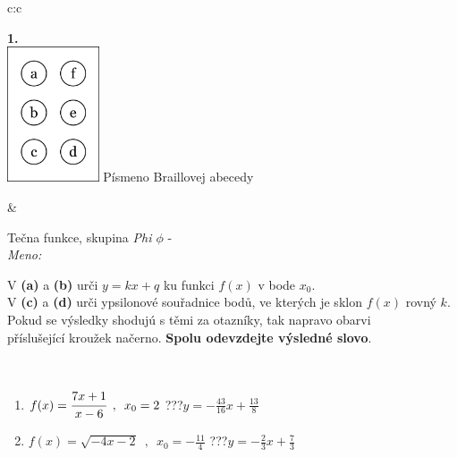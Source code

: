 \documentclass[10pt]{report}
\begin{document}
\begin{tabular}{c:c}
\begin{minipage}[c][104.5mm][t]{0.5\linewidth}
\begin{center}
\begin{minipage}{0.20\linewidth}
\begin{center}
{\Huge\bfseries 1.} \\[2mm]
\includegraphics[height=40mm]{../images/braille.png}
{\small Písmeno Braillovej abecedy}
\end{center}
\end{minipage}
\end{center}
\end{minipage}
&
\begin{minipage}[c][104.5mm][t]{0.5\linewidth}
\begin{center}
\vspace{7mm}
{\huge Tečna funkce, skupina \textit{Phi $\phi$} -}\\[5mm]
\textit{Meno:}\phantom{xxxxxxxxxxxxxxxxxxxxxxxxxxxxxxxxxxxxxxxxxxxxxxxxxxxxxxxxxxxxxxxxx}\\[5mm]
\begin{minipage}{0.95\linewidth}
\begin{center}
V \textbf{(a)} a \textbf{(b)} urči  $y = kx + q$ ku funkci $f(x)$ v bode $x_0$.\\V \textbf{(c)} a \textbf{(d)} urči ypsilonové souřadnice bodů, ve kterých je sklon $f(x)$ rovný $k$.\\Pokud se výsledky shodujú s těmi za otazníky, tak napravo obarvi\\příslušející kroužek načerno. \textbf{Spolu odevzdejte výsledné slovo}.
\end{center}
\end{minipage}
\\[1mm]
\begin{minipage}{0.79\linewidth}
\begin{center}
\begin{varwidth}{\linewidth}
\begin{enumerate}
\small
\item $f(x)=\cfrac{7x+1}{x-6}\enspace , \enspace x_0=2$\quad \dotfill\; ???\;\dotfill \quad $y = -\frac{43}{16}x+\frac{13}{8}$
\item $f(x)=\sqrt{-4x-2}\enspace , \enspace x_0=-\frac{11}{4}$\quad \dotfill\; ???\;\dotfill \quad $y = -\frac{2}{3}x+\frac{7}{3}$

\end{enumerate}
\end{varwidth}
\end{center}
\end{minipage}
\end{center}
\end{minipage}
\end{tabular}
\end{document}
